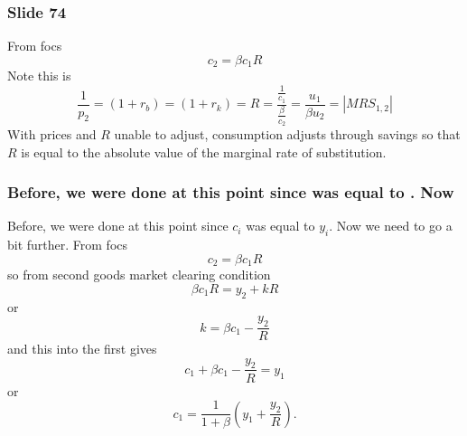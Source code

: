 \documentclass[aspectratio=169]{ltx-talk}
\begin{document}
\begin{frame}
\frametitle{Slide 74}
From focs 
\begin{equation*}
c_{2}=\beta c_{1}R
\end{equation*}%
Note this is 
\begin{equation*}
\frac{1}{p_{2}}=\left( 1+r_{b}\right) =\left( 1+r_{k}\right) =R=\frac{\frac{1%
}{c_{1}}}{\frac{\beta }{c_{2}}}=\frac{u_{1}}{\beta u_{2}}=\left\vert
MRS_{1,2}\right\vert
\end{equation*}%
With prices and $R$ unable to adjust, consumption adjusts through savings so
that $R$ is equal to the absolute value of the marginal rate of
substitution.
\end{frame}

\begin{frame}
\frametitle{Before, we were done at this point since was equal to . Now}
Before, we were done at this point since $c_{i}$ was equal to $y_{i}$. Now
we need to go a bit further. From focs 
\begin{equation*}
c_{2}=\beta c_{1}R
\end{equation*}%
so from second goods market clearing condition%
\begin{equation*}
\beta c_{1}R=y_{2}+kR
\end{equation*}%
or 
\begin{equation*}
k=\beta c_{1}-\frac{y_{2}}{R}
\end{equation*}%
and this into the first gives 
\begin{equation*}
c_{1}+\beta c_{1}-\frac{y_{2}}{R}=y_{1}
\end{equation*}%
or 
\begin{equation*}
c_{1}=\frac{1}{1+\beta }\left( y_{1}+\frac{y_{2}}{R}\right) .
\end{equation*}%
\end{frame}

\end{document}
